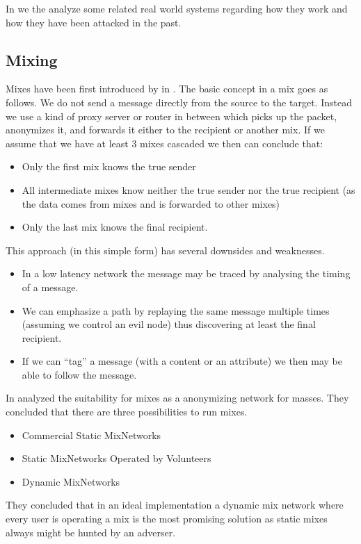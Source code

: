 In  we the analyze some related real world systems regarding how they work and how they have been attacked in the past.

\subsection{Mixing\label{sec:mixnets}}
Mixes have been first introduced by \cite{CHAUM1} in \citeyear{CHAUM1}. The basic concept in a mix goes as follows. We do not send a message directly from the source to the target. Instead we use a kind of proxy server or router in between which picks up the packet, anonymizes it, and forwards it either to the recipient or another mix. If we assume that we have at least 3 mixes cascaded we then can conclude that:
\begin{itemize}
	\item Only the first mix knows the true sender
	\item All intermediate mixes know neither the true sender nor the true recipient (as the data comes from mixes and is forwarded to other mixes) 
	\item Only the last mix knows the final recipient.
\end{itemize}

This approach (in this simple form) has several downsides and weaknesses.

\begin{itemize}
	\item In a low latency network the message may be traced by analysing the timing of a message.
	\item We can emphasize a path by replaying the same message multiple times (assuming we control an evil node) thus discovering at least the final recipient.
	\item If we can ``tag'' a message (with a content or an attribute) we then may be able to follow the message.
\end{itemize}

In \citeyear{RP03-1} \citeauthor{RP03-1} analyzed the suitability for mixes as a anonymizing network for masses. They concluded that there are three possibilities to run mixes.
\begin{itemize}
	\item Commercial Static MixNetworks
	\item Static MixNetworks Operated by Volunteers
	\item Dynamic MixNetworks
\end{itemize}
They concluded that in an ideal implementation a dynamic mix network where every user is operating a mix is the most promising solution as static mixes always might be hunted by an adverser.

